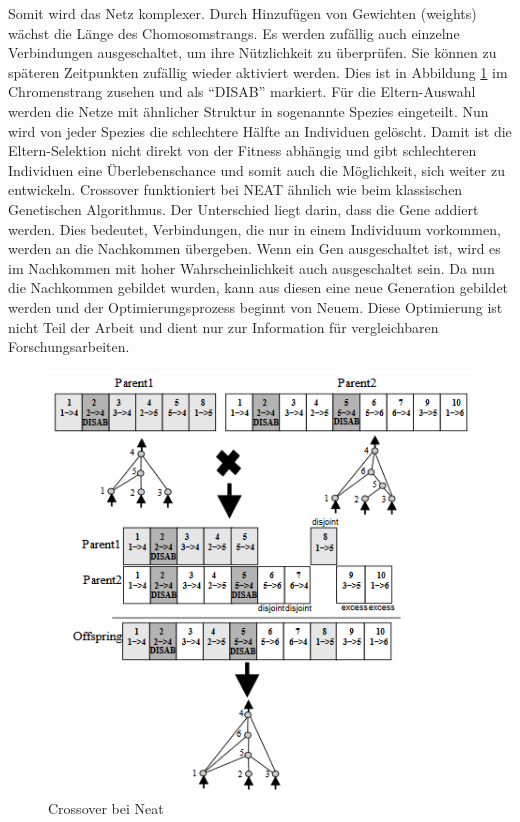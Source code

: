 Somit wird das Netz komplexer. Durch Hinzufügen von Gewichten (weights) wächst die Länge des Chomosomstrangs. Es werden zufällig auch einzelne Verbindungen ausgeschaltet, um ihre Nützlichkeit zu überprüfen. Sie können zu späteren Zeitpunkten zufällig wieder aktiviert werden. Dies ist in Abbildung \ref{fig:crossover-neat} im Chromenstrang zusehen und als "`DISAB"' markiert. Für die Eltern-Auswahl werden die Netze mit ähnlicher Struktur in sogenannte Spezies eingeteilt. Nun wird von jeder Spezies die schlechtere Hälfte an Individuen gelöscht. Damit ist die Eltern-Selektion nicht direkt von der Fitness abhängig und gibt schlechteren Individuen eine Überlebenschance und somit auch die Möglichkeit, sich weiter zu entwickeln. Crossover funktioniert bei NEAT ähnlich wie beim klassischen Genetischen Algorithmus. Der Unterschied liegt darin, dass die Gene addiert werden. Dies bedeutet, Verbindungen, die nur in einem Individuum vorkommen, werden an die Nachkommen übergeben. Wenn ein Gen ausgeschaltet ist, wird es im Nachkommen mit hoher Wahrscheinlichkeit auch ausgeschaltet sein. Da nun die Nachkommen gebildet wurden, kann aus diesen eine neue Generation gebildet werden und der Optimierungsprozess beginnt von Neuem. Diese Optimierung ist nicht Teil der Arbeit und dient nur zur Information für vergleichbaren Forschungsarbeiten.\cite{stanley2002evolving}

\noindent%
\begin{figure}[h]
  \centering  
  \includegraphics[scale=0.9]{img/crossover-neat.png}
  \caption{Crossover bei Neat \cite{stanley2002evolving}}
  \label{fig:crossover-neat}
\end{figure}

